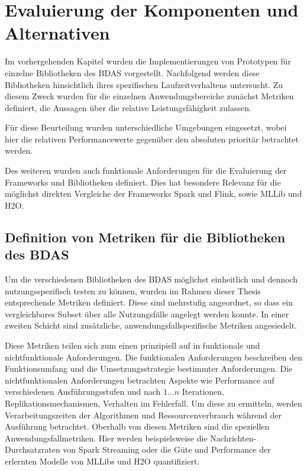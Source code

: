 \chapter{Evaluierung der Komponenten und Alternativen }
\label{chapter:evaluierung}

Im vorhergehenden Kapitel wurden die Implementierungen von Prototypen für einzelne Bibliotheken des BDAS vorgestellt. Nachfolgend werden diese Bibliotheken hinsichtlich ihres spezifischen Laufzeitverhaltens untersucht. Zu diesem Zweck wurden für die einzelnen Anwendungsbereiche zunächst Metriken definiert, die Aussagen über die relative Leistungsfähigkeit zulassen. 

Für diese Beurteilung wurden unterschiedliche Umgebungen eingesetzt, wobei hier die relativen Performancewerte gegenüber den absoluten prioritär betrachtet werden.



Des weiteren wurden auch funktionale Anforderungen für die Evaluierung der Frameworks und Bibliotheken definiert. Dies hat besondere Relevanz für die möglichst direkten Vergleiche der Frameworks Spark und Flink, sowie MLLib und H2O. 



\section{Definition von Metriken für die Bibliotheken des BDAS}
\label{section:definition der metriken}



Um die verschiedenen Bibliotheken des BDAS möglichst einheitlich und dennoch nutzungsspezifisch testen zu können, wurden im Rahmen dieser Thesis entsprechende Metriken definiert. Diese sind mehrstufig angeordnet, so dass ein vergleichbares Subset über alle Nutzungsfälle angelegt werden konnte. In einer zweiten Schicht sind zusätzliche, anwendungsfallspezifische Metriken angesiedelt. 

Diese Metriken teilen sich zum einen prinzipiell auf in funktionale und nichtfunktionale Anforderungen. Die funktionalen Anforderungen beschreiben den Funktionsumfang und die Umsetzungsstrategie bestimmter Anforderungen. Die nichtfunktionalen Anforderungen betrachten Aspekte wie Performance auf verschiedenen Ausführungsstufen und nach \(1...n\) Iterationen, Replikationsmechanismen, Verhalten im Fehlerfall. Um diese zu ermitteln, werden Verarbeitungszeiten der Algorithmen und Ressourcenverbrauch während der Ausführung betrachtet. Oberhalb von diesen Metriken sind die speziellen Anwendungsfallmetriken. Hier werden beispielsweise die Nachrichten-Durchsatzraten von Spark Streaming oder die Güte und Performance der erlernten Modelle von MLLibs und H2O quantifiziert.  



